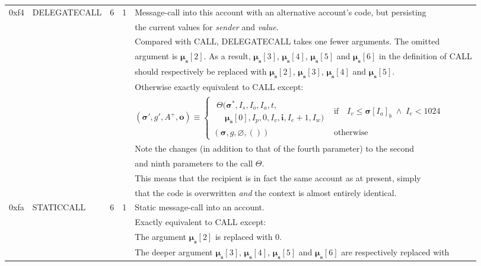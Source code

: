 \documentclass[9pt,oneside]{amsart}
\begin{document}
\begin{tabular*}{\columnwidth}[h]{rlrrl}
\midrule
0xf4 & {\small DELEGATECALL} & 6 & 1 & Message-call into this account with an alternative account's code, but persisting\\
&&&& the current values for {\it sender} and {\it value}. \\
&&&& Compared with {\small CALL}, {\small DELEGATECALL} takes one fewer arguments.  The omitted\\
&&&& argument is $\boldsymbol{\mu}_\mathbf{s}[2]$. As a result, $\boldsymbol{\mu}_\mathbf{s}[3]$, $\boldsymbol{\mu}_\mathbf{s}[4]$, $\boldsymbol{\mu}_\mathbf{s}[5]$ and $\boldsymbol{\mu}_\mathbf{s}[6]$ in the definition of {\small CALL} \\
&&&& should respectively be replaced with $\boldsymbol{\mu}_\mathbf{s}[2]$, $\boldsymbol{\mu}_\mathbf{s}[3]$, $\boldsymbol{\mu}_\mathbf{s}[4]$ and $\boldsymbol{\mu}_\mathbf{s}[5]$. \\
&&&& Otherwise exactly equivalent to {\small CALL} except: \\
&&&& $(\boldsymbol{\sigma}', g', A^+, \mathbf{o}) \equiv \begin{cases}\begin{array}{l}\Theta(\boldsymbol{\sigma}^*, I_s, I_o, I_a, t,\\\quad \boldsymbol{\mu}_\mathbf{s}[0], I_p, 0, I_v, \mathbf{i}, I_e + 1, I_w)\end{array} & \text{if} \quad I_v \leqslant \boldsymbol{\sigma}[I_a]_b \;\wedge\; I_e < 1024 \\ (\boldsymbol{\sigma}, g, \varnothing, ()) & \text{otherwise} \end{cases}$ \\
&&&& Note the changes (in addition to that of the fourth parameter) to the second \\
&&&& and ninth parameters to the call $\Theta$.\\
&&&& This means that the recipient is in fact the same account as at present, simply\\
&&&& that the code is overwritten {\it and} the context is almost entirely identical.\\
\midrule
0xfa & {\small STATICCALL} & 6 & 1 & Static message-call into an account. \\
&&&& Exactly equivalent to {\small CALL} except: \\
&&&& The argument $\boldsymbol{\mu}_\mathbf{s}[2]$ is replaced with $0$. \\
&&&& The deeper argument $\boldsymbol{\mu}_\mathbf{s}[3]$, $\boldsymbol{\mu}_\mathbf{s}[4]$, $\boldsymbol{\mu}_\mathbf{s}[5]$ and $\boldsymbol{\mu}_\mathbf{s}[6]$ are respectively replaced with \\

\end{tabular*}
\end{document}
